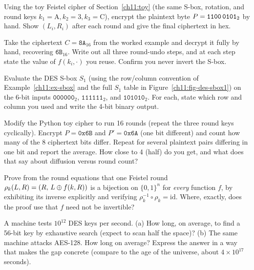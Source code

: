 \begin{exercise}
\label{ch11:ex-trace}
Using the toy Feistel cipher of Section~\ref{ch11:toy} (the same S-box, rotation, and round keys $k_1=\mathrm{A}, k_2=3, k_3=\mathrm{C}$), encrypt the plaintext byte $P = \texttt{1100\,0101}_2$ by hand. Show $(L_i, R_i)$ after each round and give the final ciphertext in hex.
\end{exercise}

\begin{exercise}
\label{ch11:ex-decrypt}
Take the ciphertext $C = \texttt{8A}_{16}$ from the worked example and decrypt it fully by hand, recovering $\texttt{6B}_{16}$. Write out all three round-undo steps, and at each step state the value of $f(k_i,\cdot)$ you reuse. Confirm you never invert the S-box.
\end{exercise}

\begin{exercise}
\label{ch11:ex-sbox-eval}
Evaluate the DES S-box $S_1$ (using the row/column convention of Example~\ref{ch11:ex-sbox} and the full $S_1$ table in Figure~\ref{ch11:fig-des-sbox1}) on the 6-bit inputs $\texttt{000000}_2$, $\texttt{111111}_2$, and $\texttt{101010}_2$. For each, state which row and column you used and write the 4-bit binary output.
\end{exercise}

\begin{exercise}
\label{ch11:ex-avalanche}
Modify the Python toy cipher to run 16 rounds (repeat the three round keys cyclically). Encrypt $P = \texttt{0x6B}$ and $P' = \texttt{0x6A}$ (one bit different) and count how many of the 8 ciphertext bits differ. Repeat for several plaintext pairs differing in one bit and report the average. How close to 4 (half) do you get, and what does that say about diffusion versus round count?
\end{exercise}

\begin{exercise}
\label{ch11:ex-invert-proof}
Prove from the round equations that one Feistel round $\rho_k(L,R) = (R,\, L \oplus f(k,R))$ is a bijection on $\{0,1\}^n$ for \emph{every} function $f$, by exhibiting its inverse explicitly and verifying $\rho_k^{-1}\circ\rho_k = \mathrm{id}$. Where, exactly, does the proof use that $f$ need not be invertible?
\end{exercise}

\begin{exercise}
\label{ch11:ex-bruteforce}
A machine tests $10^{12}$ DES keys per second. (a) How long, on average, to find a 56-bit key by exhaustive search (expect to scan half the space)? (b) The same machine attacks AES-128. How long on average? Express the answer in a way that makes the gap concrete (compare to the age of the universe, about $4\times 10^{17}$ seconds).
\end{exercise}

